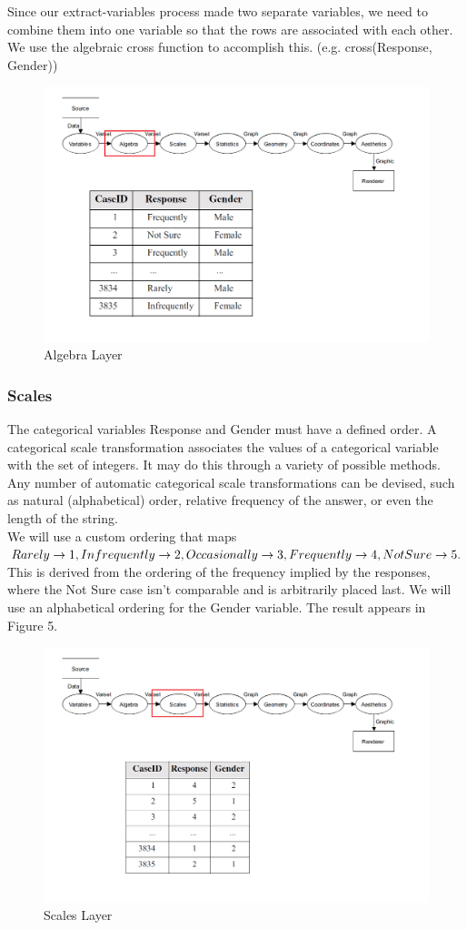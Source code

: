\documentclass[12pt]{article}
\begin{document}
Since our extract-variables process made two separate variables, we need
to combine them into one variable so that the rows are associated with each
other. We use the algebraic cross function to accomplish this. (e.g. cross(Response, Gender))
\begin{figure}[h!]
\caption{Algebra Layer}
\includegraphics[width=\textwidth]{pic/pre2}
\end{figure}
\newpage
\subsubsection{Scales}
The categorical variables Response and Gender must have a defined order.
A categorical scale transformation associates the values of a categorical
variable with the set of integers. It may do this through a variety of possible
methods. Any number of automatic categorical scale transformations can be
devised, such as natural (alphabetical) order, relative frequency of the answer,
or even the length of the string. \\
 We will use a custom ordering that maps $ Rarely \rightarrow 1, Infrequently \rightarrow 2,
Occasionally \rightarrow 3, Frequently \rightarrow 4, Not Sure \rightarrow 5. \\ $
 This is derived from the ordering
of the frequency implied by the responses, where the Not Sure case isn't
comparable and is arbitrarily placed last. We will use an alphabetical ordering
for the Gender variable. The result appears in Figure 5.
\begin{figure}[h!]
\caption{Scales Layer}
\includegraphics[width=\textwidth]{pic/pre3}
\end{figure}
\newpage
\end{document}
